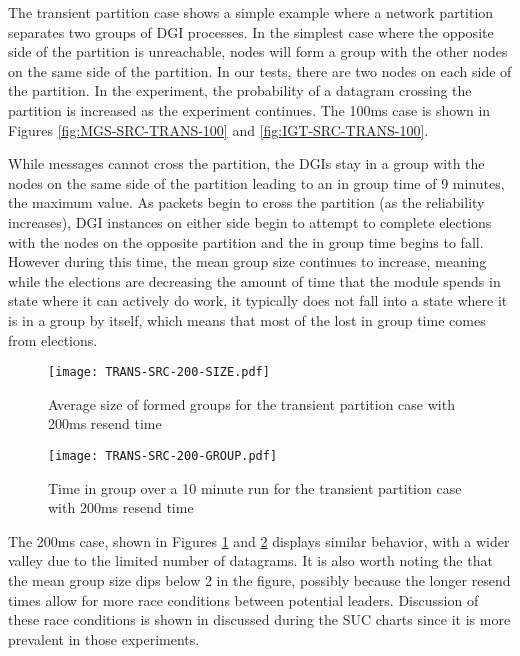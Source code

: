 The transient partition case shows a simple example where a network partition
separates two groups of DGI processes. In the simplest case where the opposite side of
the partition is unreachable, nodes will form a group with the other nodes on the
same side of the partition. In our tests, there are two nodes on each side of
the partition. In the experiment, the probability of a datagram crossing the
partition is increased as the experiment continues. The 100ms case is shown in
Figures \ref{fig:MGS-SRC-TRANS-100} and \ref{fig:IGT-SRC-TRANS-100}.

While messages cannot cross the partition, the DGIs stay in a group with the
nodes on the same side of the partition leading to an in group time of 9 minutes,
the maximum value. As packets begin to cross the partition (as the reliability
increases), DGI instances on either side begin to attempt to complete elections
with the nodes on the opposite partition and the in group time begins to fall.
However during this time, the mean group size continues to increase, meaning
while the elections are decreasing the amount of time that the module spends in
state where it can actively do work, it typically does not fall into a state
where it is in a group by itself, which means that most of the lost in group
time comes from elections.

\begin{figure}[!h]
\centering
\texttt{[image: TRANS-SRC-200-SIZE.pdf]}
\caption{Average size of formed groups for the transient partition case with 200ms resend time}
\label{fig:MGS-SRC-TRANS-200}
\end{figure}

\begin{figure}[!h]
\centering
\texttt{[image: TRANS-SRC-200-GROUP.pdf]}
\caption{Time in group over a 10 minute run for the transient partition case with 200ms resend time}
\label{fig:IGT-SRC-TRANS-200}
\end{figure}

The 200ms case, shown in Figures \ref{fig:MGS-SRC-TRANS-200} and \ref{fig:IGT-SRC-TRANS-200} displays similar behavior, with a wider valley due to the
limited number of datagrams. It is also worth noting the that the mean group
size dips below 2 in the figure, possibly because the longer resend times allow
for more race conditions between potential leaders. Discussion of these race
conditions is shown in discussed during the SUC charts since it is more prevalent
in those experiments.

